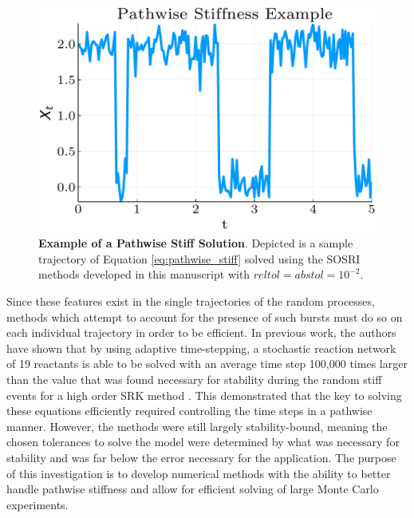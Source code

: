 \documentclass{article}
\begin{document}
\begin{figure}
	\begin{centering}
		\includegraphics[scale=0.5]{paper_figures/pathwise_stiffness}
		\par\end{centering}
	\caption{\textbf{Example of a Pathwise Stiff Solution}. Depicted is a sample
		trajectory of Equation \ref{eq:pathwise_stiff} solved using the SOSRI
		methods developed in this manuscript with $reltol=abstol=10^{-2}$.
		\label{fig:pathwise_stiff}}
\end{figure}

Since these features exist in the single trajectories of the random
processes, methods which attempt to account for the presence of such
bursts must do so on each individual trajectory in order to be efficient.
In previous work, the authors have shown that by using adaptive time-stepping,
a stochastic reaction network of 19 reactants is able to be solved
with an average time step 100,000 times larger than the value that
was found necessary for stability during the random stiff events for
a high order SRK method \cite{RN3787}. This demonstrated that the
key to solving these equations efficiently required controlling the
time steps in a pathwise manner. However, the methods were still largely
stability-bound, meaning the chosen tolerances to solve the model
were determined by what was necessary for stability and was far below
the error necessary for the application. The purpose of this investigation
is to develop numerical methods with the ability to better handle
pathwise stiffness and allow for efficient solving of large Monte
Carlo experiments.
\end{document}
